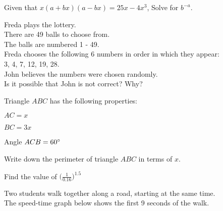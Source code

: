 \documentclass{exam}
\begin{document}
\begin{questions}

    \question Given that $x(a+bx)(a-bx)=25x-4x^3$, Solve for $b^{-a}$.
    \newpage

    \question Freda plays the lottery.\\

    There are 49 balls to choose from.\\
    The balls are numbered 1 - 49.\\

    Freda chooses the following 6 numbers in order in which they appear:\\ 3, 4, 7, 12, 19, 28.\\
    John believes the numbers were chosen randomly.\\
    Is it possible that John is not correct? Why?
    \newpage

    \question Triangle $ABC$ has the following properties:
    \begin{description}
        \item $AC=x$
        \item $BC=3x$
        \item Angle $ACB=60\degree$
    \end{description}
    Write down the perimeter of triangle $ABC$ in terms of $x$.
    \newpage

    \question Find the value of $\big(\frac{1}{0.16}\big)^{1.5}$
    \newpage

    \question Two students walk together along a road, starting at the same time.\\
    The speed-time graph below shows the first 9 seconds of the walk.
    
    \begin{center}
\end{center}
\end{questions}
\end{document}
